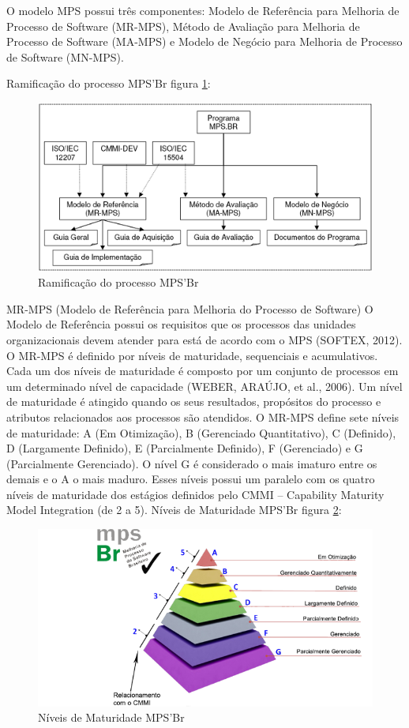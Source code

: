 \documentclass[	DIV=calc,%
							paper=a4,%
							fontsize=12pt,%
							onecolumn]{scrartcl}	 					%
\begin{document}
O modelo MPS possui três componentes: Modelo de Referência para Melhoria de Processo de Software (MR-MPS), Método de Avaliação para Melhoria de Processo de Software (MA-MPS) e Modelo de Negócio para Melhoria de Processo de Software (MN-MPS).

Ramificação do processo MPS'Br figura \ref{rup4}: 
 \begin{figure}[h!]
	\includegraphics[scale=0.8]{ArvoreMPS.png}
	\caption{Ramificação do processo MPS'Br}
	\label{rup4}
\end{figure}

MR-MPS (Modelo de Referência para Melhoria do Processo de Software)
O Modelo de Referência possui os requisitos que os processos das unidades organizacionais devem atender para está de acordo com o MPS (SOFTEX, 2012). O MR-MPS é definido por níveis de maturidade, sequenciais e acumulativos. Cada um dos níveis de maturidade é composto por um conjunto de processos em um determinado nível de capacidade (WEBER, ARAÚJO, et al., 2006). Um nível de maturidade é atingido quando os seus resultados, propósitos do processo e atributos relacionados aos processos são atendidos.
O MR-MPS define sete níveis de maturidade: A (Em Otimização), B (Gerenciado Quantitativo), C (Definido), D (Largamente Definido), E (Parcialmente Definido), F (Gerenciado) e G (Parcialmente Gerenciado). O nível G é considerado o mais imaturo entre os demais e o A o mais maduro. Esses níveis possui um paralelo com os quatro níveis de maturidade dos estágios definidos pelo CMMI – Capability Maturity Model Integration (de 2 a 5).
Níveis de Maturidade MPS'Br figura \ref{rup2}: 
 \begin{figure}[h!]
	\includegraphics[scale=2.8]{mpsbr.png}
	\caption{Níveis de Maturidade MPS'Br}
	\label{rup2}
\end{figure}
\end{document}
